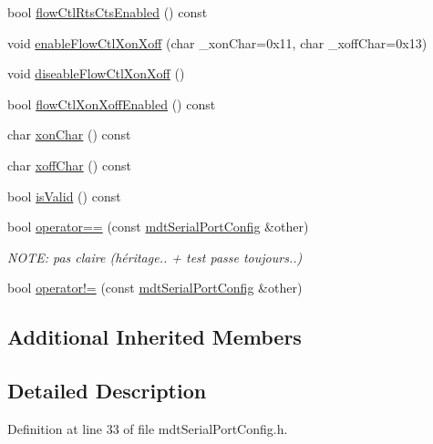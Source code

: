 \begin{DoxyCompactItemize}
\item 
bool \hyperlink{classmdt_serial_port_config_a7d57e9d14db59ba8d723daefbb2ad551}{flow\-Ctl\-Rts\-Cts\-Enabled} () const 
\item 
void \hyperlink{classmdt_serial_port_config_aff4d979dc07061dd7ddaba01a08e39e2}{enable\-Flow\-Ctl\-Xon\-Xoff} (char \-\_\-xon\-Char=0x11, char \-\_\-xoff\-Char=0x13)
\item 
void \hyperlink{classmdt_serial_port_config_a1ae8683186b22de6cb1faa23191c1403}{diseable\-Flow\-Ctl\-Xon\-Xoff} ()
\item 
bool \hyperlink{classmdt_serial_port_config_aab953b67c1cc653f42aa1e439a5f586a}{flow\-Ctl\-Xon\-Xoff\-Enabled} () const 
\item 
char \hyperlink{classmdt_serial_port_config_a8c86f4dc3114dbd9f4e45d4fd6477b2c}{xon\-Char} () const 
\item 
char \hyperlink{classmdt_serial_port_config_a1ddd8b2b446f709d8d500a5be77d9584}{xoff\-Char} () const 
\item 
bool \hyperlink{classmdt_serial_port_config_ab450b1a53c5b2686bd979d42aabb323f}{is\-Valid} () const 
\item 
bool \hyperlink{classmdt_serial_port_config_a31680194276513004e91cd3bee85a398}{operator==} (const \hyperlink{classmdt_serial_port_config}{mdt\-Serial\-Port\-Config} \&other)
\begin{DoxyCompactList}\small\item\em N\-O\-T\-E\-: pas claire (héritage.. + test passe toujours..) \end{DoxyCompactList}\item 
bool \hyperlink{classmdt_serial_port_config_aef2d7d8f2ca726977bc31eeb96dbe3c5}{operator!=} (const \hyperlink{classmdt_serial_port_config}{mdt\-Serial\-Port\-Config} \&other)
\end{DoxyCompactItemize}
\subsection*{Additional Inherited Members}


\subsection{Detailed Description}


Definition at line 33 of file mdt\-Serial\-Port\-Config.\-h.




